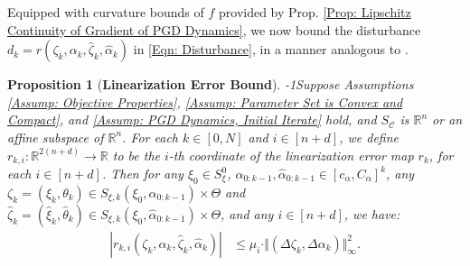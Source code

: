 \documentclass[letterpaper, 10 pt, conference]{ieeeconf}
\newcommand{\ra}{\rightarrow}
\newcommand{\R}{\mathbb{R}}
\newcommand{\?}{\stackrel{?}{=}}
\newcommand{\param}{\theta}
\newcommand{\paramDim}{d}
\newcommand{\paramSet}{\Theta}
\newcommand{\var}{\xi}
\newcommand{\varDim}{n}
\newcommand{\varNominal}{\hat\var}
\newcommand{\paramNominal}{\hat\param}
\newcommand{\ratePGDNominal}{\hat\ratePGD}
\newcommand{\ratePGDError}{\Delta\ratePGD}
\newcommand{\linearizationError}{r}
\newcommand{\disturbance}{d}
\newcommand{\ratePGD}{\alpha}
\newcommand{\ratePGDMin}{c_\ratePGD}
\newcommand{\ratePGDMax}{C_\ratePGD}
\newcommand{\constraintSet}{{S_{\mathcal{C}}}}
\newcommand{\iterationHorizon}{N}
\newcommand{\state}{\zeta}
\newcommand{\stateNominal}{\hat\state}
\newcommand{\stateError}{\Delta\state}
\newcommand{\dynamicsFullState}{f}
\newcommand{\varInitialSet}{S_\var^0}
\newcommand{\hessianBound}{\mu}
\newcommand{\varForwardReachableSet}[1]{S_{\var, {#1}}}
\newtheorem{proposition}{Proposition}
\begin{document}
Equipped with curvature bounds of $\dynamicsFullState$ provided by Prop. \ref{Prop: Lipschitz Continuity of Gradient of PGD Dynamics}, we now bound the disturbance $\disturbance_k = \linearizationError(\state_k, \ratePGD_k, \stateNominal_k, \ratePGDNominal_k)$ in \eqref{Eqn: Disturbance}, in a manner analogous to \cite[Prop. III.1]{Leeman2025RobustNonlinearOptimalControlviaSLS}.

\begin{proposition}[\textbf{Linearization Error Bound}]
\label{Prop: Quadratic Bound on Linearization Error}
\looseness-1Suppose Assumptions \ref{Assump: Objective Properties}, \ref{Assump: Parameter Set is Convex and Compact}, and \ref{Assump: PGD Dynamics, Initial Iterate} hold, and $\constraintSet$ is $\R^\varDim$ or an affine subspace of $\R^\varDim$.
For each $k \in [0, \iterationHorizon]$ and $i \in [\varDim + \paramDim]$, we define $r_{k,i}: \R^{2(\varDim + \paramDim)} \ra \R$ to be the $i$-th coordinate of the linearization error map $r_k$,
for each $i \in [\varDim + \paramDim]$.
Then for any $\var_0 \in  \varInitialSet$, $\ratePGD_{0:k-1}, \ratePGDNominal_{0:k-1} \in [\ratePGDMin, \ratePGDMax]^k$, any $\state_k = (\var_k, \param_k) \in \varForwardReachableSet{k}(\var_0, \ratePGD_{0:k-1}) \times \paramSet$ and $\stateNominal_k = (\varNominal_k, \paramNominal_k) \in \varForwardReachableSet{k}(\var_0, \ratePGDNominal_{0:k-1}) \times \paramSet$, and any $i \in [\varDim + \paramDim]$, we have:
\begin{align}
\label{Eqn: Quadratic Bound on Linearization Error}
    |\linearizationError_{k,i}(\state_k, \ratePGD_k, \stateNominal_k, \ratePGDNominal_k)| &\leq \hessianBound_i \cdot \Vert (\stateError_k, \ratePGDError_k) \Vert_\infty^2.
\end{align}
\end{proposition}
\end{document}
